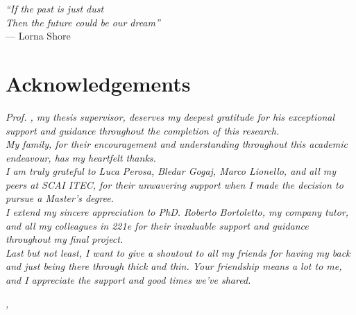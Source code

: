 \cleardoublepage
{}
{}

\begin{flushright}{
    \slshape
    ``If the past is just dust \\
    Then the future could be our dream''} \\
    \medskip
    --- Lorna Shore
\end{flushright}


\bigskip

\begingroup
\let\clearpage\relax
\let\cleardoublepage\relax
\let\cleardoublepage\relax

\chapter*{Acknowledgements}

\noindent \textit{Prof. \myProf, my thesis supervisor, deserves my deepest gratitude for his exceptional support and guidance throughout the completion of this research.}\\
\noindent \textit{My family, for their encouragement and understanding throughout this academic endeavour, has my heartfelt thanks.}\\
\noindent \textit{I am truly grateful to Luca Perosa, Bledar Gogaj, Marco Lionello, and all my peers at SCAI ITEC, for their unwavering support when I made the decision to pursue a Master’s degree.}\\
\noindent \textit{I extend my sincere appreciation to PhD. Roberto Bortoletto, my company tutor, and all my colleagues in 221e for their invaluable support and guidance throughout my final project.}\\
\noindent \textit{Last but not least, I want to give a shoutout to all my friends for having my back and just being there through thick and thin. Your friendship means a lot to me, and I appreciate the support and good times we've shared.}\\
\bigskip

\noindent\textit{\myLocation, \myTime}
\hfill \myName

\endgroup
